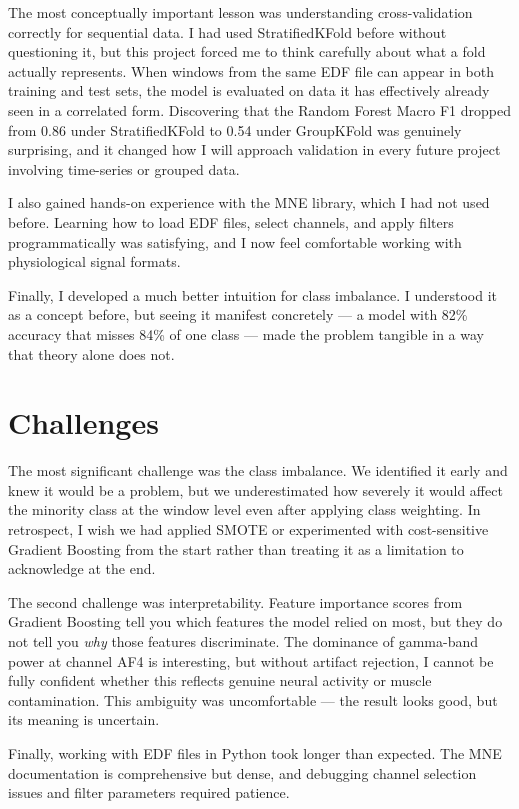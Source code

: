\documentclass[12pt,a4paper]{article}
\begin{document}
The most conceptually important lesson was understanding cross-validation correctly for sequential data. I had used StratifiedKFold before without questioning it, but this project forced me to think carefully about what a fold actually represents. When windows from the same EDF file can appear in both training and test sets, the model is evaluated on data it has effectively already seen in a correlated form. Discovering that the Random Forest Macro F1 dropped from 0.86 under StratifiedKFold to 0.54 under GroupKFold was genuinely surprising, and it changed how I will approach validation in every future project involving time-series or grouped data.

I also gained hands-on experience with the MNE library, which I had not used before. Learning how to load EDF files, select channels, and apply filters programmatically was satisfying, and I now feel comfortable working with physiological signal formats.

Finally, I developed a much better intuition for class imbalance. I understood it as a concept before, but seeing it manifest concretely --- a model with 82\% accuracy that misses 84\% of one class --- made the problem tangible in a way that theory alone does not.

\section*{Challenges}

The most significant challenge was the class imbalance. We identified it early and knew it would be a problem, but we underestimated how severely it would affect the minority class at the window level even after applying class weighting. In retrospect, I wish we had applied SMOTE or experimented with cost-sensitive Gradient Boosting from the start rather than treating it as a limitation to acknowledge at the end.

The second challenge was interpretability. Feature importance scores from Gradient Boosting tell you which features the model relied on most, but they do not tell you \emph{why} those features discriminate. The dominance of gamma-band power at channel AF4 is interesting, but without artifact rejection, I cannot be fully confident whether this reflects genuine neural activity or muscle contamination. This ambiguity was uncomfortable --- the result looks good, but its meaning is uncertain.

Finally, working with EDF files in Python took longer than expected. The MNE documentation is comprehensive but dense, and debugging channel selection issues and filter parameters required patience.
\end{document}
